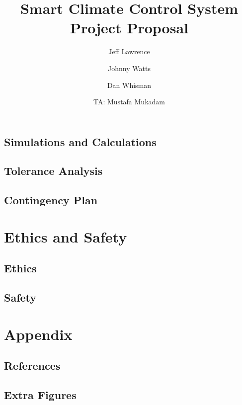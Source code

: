 \documentclass[draft,titlepage]{article}
\title{Smart Climate Control System\\Project Proposal}
\author{Jeff Lawrence
   \and Johnny Watts
   \and Dan Whisman
   \and TA: Mustafa Mukadam}
\begin{document}
\maketitle

\setcounter{secnumdepth}{5}

\tableofcontents







\subsection{Simulations and Calculations}




\subsection{Tolerance Analysis}



\subsection{Contingency Plan}

\section{Ethics and Safety}
\subsection{Ethics}
\subsection{Safety}

\section{Appendix}
\subsection{References}
\subsection{Extra Figures}
\end{document}
